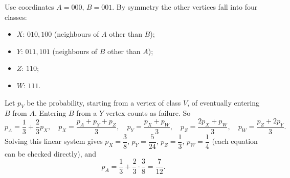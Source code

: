 Use coordinates $A=000$, $B=001$. By symmetry the other vertices fall into four classes:
\begin{itemize}
\item $X$: $010,100$ (neighbours of $A$ other than $B$);
\item $Y$: $011,101$ (neighbours of $B$ other than $A$);
\item $Z$: $110$;
\item $W$: $111$.
\end{itemize}
Let $p_V$ be the probability, starting from a vertex of class $V$, of eventually entering $B$ from $A$. Entering $B$ from a $Y$ vertex counts as failure. So
\[
p_A=\dfrac{1}{3}+\dfrac{2}{3}p_X,\quad p_X=\dfrac{p_A+p_Y+p_Z}{3},\quad p_Y=\dfrac{p_X+p_W}{3},\quad p_Z=\dfrac{2p_X+p_W}{3},\quad p_W=\dfrac{p_Z+2p_Y}{3} .
\]
Solving this linear system gives $p_X=\dfrac{3}{8}$, $p_Y=\dfrac{5}{24}$, $p_Z=\dfrac{1}{3}$, $p_W=\dfrac{1}{4}$ (each equation can be checked directly), and
\[
p_A=\dfrac{1}{3}+\dfrac{2}{3}\cdot\dfrac{3}{8}=\boxed{\dfrac{7}{12}}.
\]
